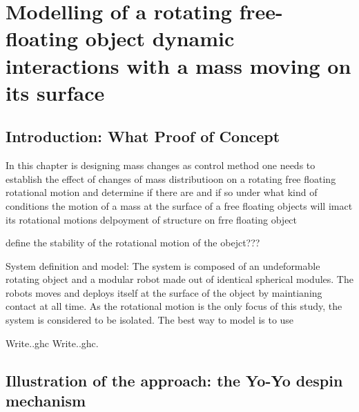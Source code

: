 

\chapter{Modelling of a rotating free-floating object dynamic interactions with a mass moving on its surface}
\label{ch:Stability study}

\section{Introduction: What Proof of Concept}
\label{Introduction: What Proof of Concept}
In this chapter is designing mass changes as control method one needs to establish the effect of changes of mass distributioon on a rotating free floating rotational motion and determine if there are and if so under what kind of conditions the motion of a mass at the surface of a free floating objects will imact its rotational motions
delpoyment of structure on frre floating object

define the stability of the rotational motion of the obejct???

System definition and model: The system is composed of an undeformable rotating object and a modular robot made out of identical spherical modules. The robots moves and deploys itself at the surface of the object by maintianing contact at all time. As the rotational motion is the only focus of this study, the system is considered to be isolated.
The best way to model is to use 

Write..\gls{ghc}
Write..\gls{ghc}.

\section{Illustration of the approach: the Yo-Yo despin mechanism}
\label{Illustration of the approach: the Yo-Yo despin mechanism}
